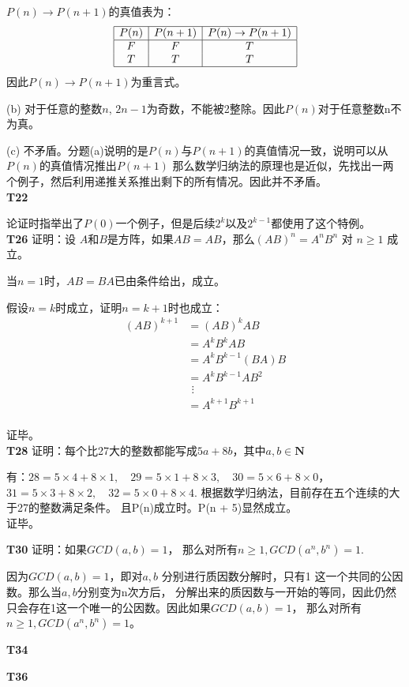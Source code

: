 \documentclass[12pt, a4paper]{ctexart}
\begin{document}
$P(n) \rightarrow P(n + 1)$的真值表为：\[
\begin{array}{|c|c|c|}
    \hline
    P(n) & P(n + 1) & P(n) \rightarrow P(n + 1)\\
    \hline
    F & F & T\\
    T & T & T\\
    \hline
\end{array}
\]
因此$P(n) \rightarrow P(n + 1)$为重言式。

(b) 对于任意的整数$n$, $2n - 1$为奇数，不能被2整除。因此$P(n)$对于任意整数n不为真。

(c) 不矛盾。分题(a)说明的是$P(n)$与$P(n + 1)$的真值情况一致，说明可以从$P(n)$的真值情况推出$P(n + 1)$
那么数学归纳法的原理也是近似，先找出一两个例子，然后利用递推关系推出剩下的所有情况。因此并不矛盾。\\

\textbf{T22}

论证时指举出了$P(0)$一个例子，但是后续$2^k$以及$2^{k-1}$都使用了这个特例。\\

\textbf{T26} 证明：设 $A$和$B$是方阵，如果$AB = AB$，那么$(AB)^n = A^nB^n$ 对 $n \geqslant 1$ 成立。

当$n = 1$时，$AB=BA$已由条件给出，成立。

假设$n = k$时成立，证明$n = k + 1$时也成立：
\begin{align*}
    (AB)^{k + 1} &= (AB)^k AB\\
    &=A^kB^kAB\\
    &=A^kB^{k-1}(BA)B\\
    &=A^kB^{k-1}AB^2\\
    &\ \, \vdots\\
    &=A^{k+1}B^{k+1}\\
\end{align*}

证毕。\\

\textbf{T28} 证明：每个比27大的整数都能写成$5a+8b$，其中$a, b \in \textbf{N}$

有：$28 = 5 \times 4 + 8 \times 1, \quad 29 = 5 \times 1 + 8 \times 3, \quad 30 = 5 \times 6 + 8 \times 0$，\\ 
$31 = 5 \times 3 + 8 \times 2, \quad 32 = 5 \times 0 + 8 \times 4$.
根据数学归纳法，目前存在五个连续的大于27的整数满足条件。
且P(n)成立时。P(n + 5)显然成立。\\
证毕。

\textbf{T30} 证明：如果$GCD(a, b) = 1$， 那么对所有$n \geq 1, GCD(a^n, b^n) = 1$.

因为$GCD(a, b) = 1$，即对$a, b$ 分别进行质因数分解时，只有1 这一个共同的公因数。那么当$a, b$分别变为n次方后，
分解出来的质因数与一开始的等同，因此仍然只会存在1这一个唯一的公因数。因此如果$GCD(a, b) = 1$， 那么对所有$n \geq 1, GCD(a^n, b^n) = 1$。

\textbf{T34}



\textbf{T36}
\end{document}
